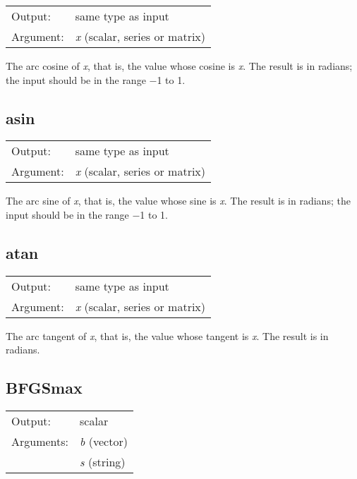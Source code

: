 \begin{tabular}{ll}
Output:     & same type as input\\
Argument:   & \textsl{x} (scalar, series or matrix)\\
\end{tabular}

	  The arc cosine of \textsl{x}, that is, the value whose
	  cosine is \textsl{x}.  The result is in radians; the input
	  should be in the range $-$1 to 1.

\subsection{asin}
\hypertarget{func-asin}{}

\begin{tabular}{ll}
Output:     & same type as input\\
Argument:   & \textsl{x} (scalar, series or matrix)\\
\end{tabular}

	  The arc sine of \textsl{x}, that is, the value whose sine
	  is \textsl{x}.  The result is in radians; the input should
	  be in the range $-$1 to 1.

\subsection{atan}
\hypertarget{func-atan}{}

\begin{tabular}{ll}
Output:     & same type as input\\
Argument:   & \textsl{x} (scalar, series or matrix)\\
\end{tabular}

	  The arc tangent of \textsl{x}, that is, the value whose
	  tangent is \textsl{x}.  The result is in radians.

\subsection{BFGSmax}
\hypertarget{func-BFGSmax}{}

\begin{tabular}{ll}
Output:     & scalar\\
Arguments:  & \textsl{b} (vector)\\
           & \textsl{s} (string)\\
\end{tabular}


